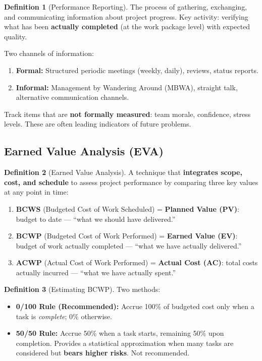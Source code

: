 \documentclass[11pt,a4paper]{article}
\theoremstyle{definition}
\newtheorem{definition}{Definition}[section]
\theoremstyle{plain}
\begin{document}
\begin{definition}[Performance Reporting]
The process of gathering, exchanging, and communicating information about project progress. Key activity: verifying what has been \textbf{actually completed} (at the work package level) with expected quality.
\end{definition}

Two channels of information:
\begin{enumerate}[nosep, label=\arabic*.]
  \item \textbf{Formal:} Structured periodic meetings (weekly, daily), reviews, status reports.
  \item \textbf{Informal:} Management by Wandering Around (MBWA), straight talk, alternative communication channels.
\end{enumerate}

\begin{remark}
Track items that are \textbf{not formally measured}: team morale, confidence, stress levels. These are often leading indicators of future problems.
\end{remark}

\subsection{Earned Value Analysis (EVA)}

\begin{definition}[Earned Value Analysis]
A technique that \textbf{integrates scope, cost, and schedule} to assess project performance by comparing three key values at any point in time:
\begin{enumerate}[nosep, label=\arabic*.]
  \item \textbf{BCWS} (Budgeted Cost of Work Scheduled) = \textbf{Planned Value (PV)}: budget to date --- ``what we should have delivered.''
  \item \textbf{BCWP} (Budgeted Cost of Work Performed) = \textbf{Earned Value (EV)}: budget of work actually completed --- ``what we have actually delivered.''
  \item \textbf{ACWP} (Actual Cost of Work Performed) = \textbf{Actual Cost (AC)}: total costs actually incurred --- ``what we have actually spent.''
\end{enumerate}
\end{definition}

\begin{definition}[Estimating BCWP]
Two methods:
\begin{itemize}[nosep]
  \item \textbf{0/100 Rule (Recommended):} Accrue 100\% of budgeted cost only when a task is \emph{complete}; 0\% otherwise.
  \item \textbf{50/50 Rule:} Accrue 50\% when a task starts, remaining 50\% upon completion. Provides a statistical approximation when many tasks are considered but \textbf{bears higher risks}. Not recommended.
\end{itemize}
\end{definition}
\end{document}
